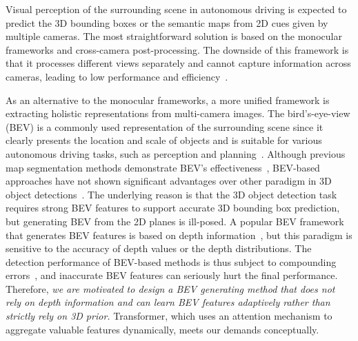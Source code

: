 \documentclass{article}
\begin{document}
Visual perception of the surrounding scene in autonomous driving is expected to predict the 3D bounding boxes or the semantic maps from 2D cues given by multiple cameras. The most straightforward solution is based on the  monocular frameworks \cite{wang2021fcos3d,wang2022probabilistic,park2021pseudo,reiher2020sim2real,bruls2019right} and cross-camera post-processing. The downside of this framework is that
it processes different views separately and cannot capture information across cameras, leading to 
low performance and efficiency~\cite{philion2020lift,wang2022detr3d}.




As an alternative to the monocular frameworks, a more unified framework is extracting holistic representations from multi-camera images. 
The bird's-eye-view (BEV) is a commonly used representation of the surrounding scene since it clearly presents the location and scale of objects and is suitable for various autonomous driving tasks, such as perception and planning~\cite{ng2020bev}.
Although previous map segmentation methods demonstrate BEV's effectiveness~\cite{philion2020lift,hu2021fiery,ng2020bev}, BEV-based approaches have not shown significant advantages over other paradigm in 3D object detections~\cite{wang2022detr3d,park2021pseudo,reading2021categorical}. 
The underlying reason is that the 3D object detection task requires strong BEV features to support accurate 3D bounding box prediction, but generating BEV from the 2D planes is ill-posed.
A popular BEV framework that generates BEV features is based on depth information~\cite{wang2019pseudo,philion2020lift,reading2021categorical}, but this paradigm is sensitive to the accuracy of depth values or the depth distributions. The detection performance of BEV-based methods is thus subject to compounding errors~\cite{wang2022detr3d}, and inaccurate BEV features can seriously hurt the final performance. Therefore, \emph{we are motivated to design a BEV generating method that does not rely on depth information and can learn BEV features adaptively rather than strictly rely on 3D prior.}
Transformer, which uses an attention mechanism to aggregate valuable features dynamically, meets our demands conceptually.
\end{document}
